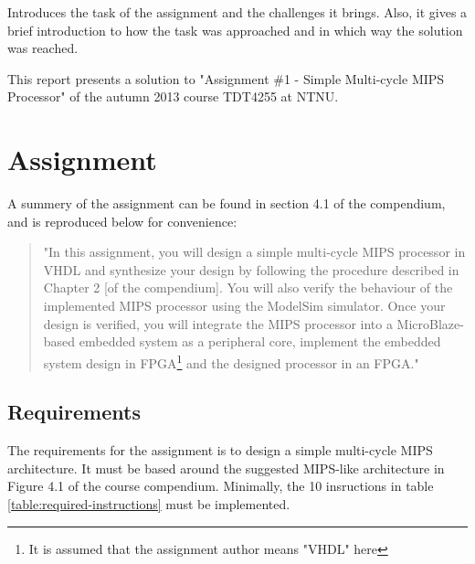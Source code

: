 Introduces the task of the assignment and the challenges it
brings.
Also, it gives a brief introduction to how the task was approached and in which way the solution was reached.


This report presents a solution to "Assignment \#1 - Simple Multi-cycle MIPS Processor" of the autumn 2013 course TDT4255 at NTNU.

\section{Assignment}

A summery of the assignment can be found in section 4.1 of the compendium\cite{compendium}, and is reproduced below for convenience:

\begin{quote}
"In this assignment, you will design a simple multi-cycle MIPS processor in VHDL and synthesize your design by following the procedure described in Chapter 2 [of the compendium\cite{compendium}].
You will also verify the behaviour of the implemented MIPS processor using the ModelSim simulator.
Once your design is verified, you will integrate the MIPS processor into a MicroBlaze-based embedded system as a peripheral core, implement the embedded system design in FPGA\footnote{It is assumed that the assignment author means "VHDL" here} and the designed processor in an FPGA."
\end{quote}

\subsection{Requirements}

The requirements for the assignment is to design a simple multi-cycle MIPS architecture.
It must be based around the suggested MIPS-like architecture in Figure 4.1 of the course compendium\cite{compendium}.
Minimally, the 10 insructions in table \ref{table:required-instructions} must be implemented.

